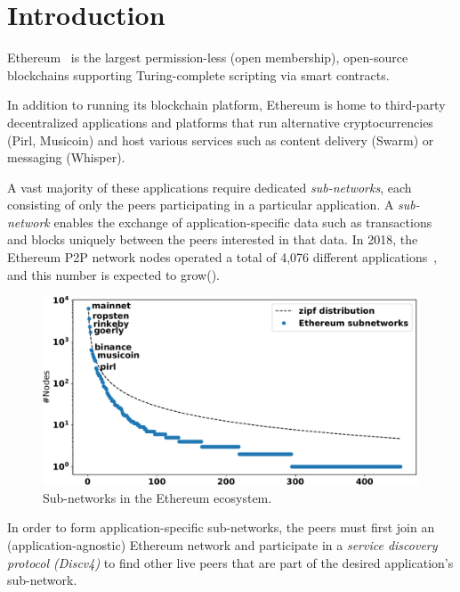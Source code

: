 
\section{Introduction}

Ethereum~\cite{buterin2013ethereum}  is the largest permission-less (\ie open membership), open-source blockchains supporting Turing-complete scripting via smart contracts. 

In addition to running its blockchain platform, Ethereum is home to third-party decentralized applications and platforms that run alternative cryptocurrencies (Pirl, Musicoin) and host various services such as content delivery (Swarm) or messaging (Whisper).

A vast majority of these applications require dedicated \emph{sub-networks}, each consisting of only the peers participating in a particular application. 
A \emph{sub-network} enables the exchange of application-specific data such as transactions and blocks uniquely between the peers interested in that data. In 2018, the Ethereum P2P network nodes operated a total of 4,076 different applications~\cite{kim2018measuring}, and this number is expected to grow().

\begin{figure}
    \includegraphics[width=1\linewidth]{img/ecosystem}
    \caption{Sub-networks in the Ethereum ecosystem.}
    \label{fig:ecosystem}
\end{figure}



In order to form application-specific sub-networks, the peers must first join an (application-agnostic) Ethereum network and participate in a \textit{service discovery protocol (Discv4)} to find other live peers that are part of the desired application's sub-network. 

